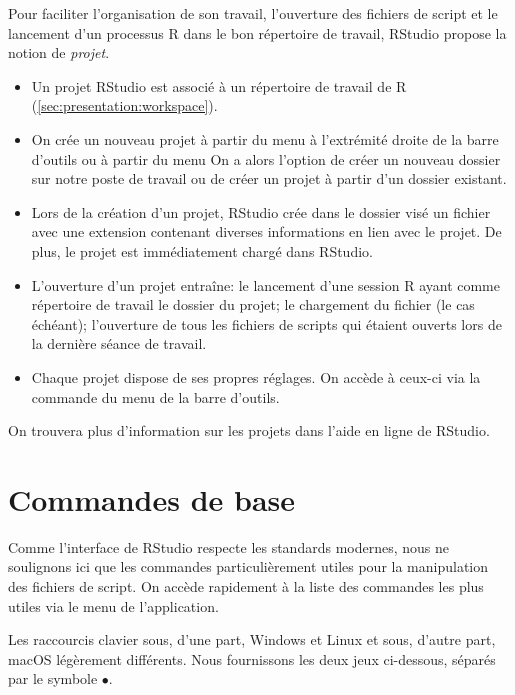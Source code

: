 Pour faciliter l'organisation de son travail, l'ouverture des fichiers
de script et le lancement d'un processus R dans le bon répertoire de
travail, RStudio propose la notion de \emph{projet}.
\begin{itemize}
\item Un projet RStudio est associé à un répertoire de travail de R
  (\autoref{sec:presentation:workspace}).
\item On crée un nouveau projet à partir du menu  à
  l'extrémité droite de la barre d'outils ou à partir du menu
   On a alors l'option de créer un nouveau
  dossier sur notre poste de travail ou de créer un projet à partir
  d'un dossier existant.
\item Lors de la création d'un projet, RStudio crée dans le dossier
  visé un fichier avec une extension  contenant diverses
  informations en lien avec le projet. De plus, le projet est
  immédiatement chargé dans RStudio.
\item L'ouverture d'un projet entraîne: le lancement d'une session R
  ayant comme répertoire de travail le dossier du projet; le
  chargement du fichier  (le cas échéant); l'ouverture de
  tous les fichiers de scripts qui étaient ouverts lors de la dernière
  séance de travail.
\item Chaque projet dispose de ses propres réglages. On accède à
  ceux-ci via la commande  du menu
   de la barre d'outils.
\end{itemize}

On trouvera plus d'information sur les projets dans l'aide en ligne
de RStudio.


\section{Commandes de base}
\label{sec:rstudio:commandes}

Comme l'interface de RStudio respecte les standards modernes, nous ne
soulignons ici que les commandes particulièrement utiles pour la
manipulation des fichiers de script. On accède rapidement à la liste
des commandes les plus utiles via le menu  de
l'application.

Les raccourcis clavier sous, d'une part, Windows et Linux et sous,
d'autre part, macOS légèrement différents. Nous fournissons les deux
jeux ci-dessous, séparés par le symbole $\bullet$.

